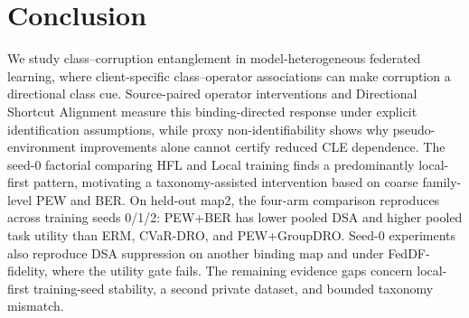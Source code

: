 \section{Conclusion}

We study class--corruption entanglement in model-heterogeneous federated learning, where client-specific class--operator associations can make corruption a directional class cue. Source-paired operator interventions and Directional Shortcut Alignment measure this binding-directed response under explicit identification assumptions, while proxy non-identifiability shows why pseudo-environment improvements alone cannot certify reduced CLE dependence. The seed-0 factorial comparing HFL and Local training finds a predominantly local-first pattern, motivating a taxonomy-assisted intervention based on coarse family-level PEW and BER. On held-out map2, the four-arm comparison reproduces across training seeds 0/1/2: PEW+BER has lower pooled DSA and higher pooled task utility than ERM, CVaR-DRO, and PEW+GroupDRO. Seed-0 experiments also reproduce DSA suppression on another binding map and under FedDF-fidelity, where the utility gate fails. The remaining evidence gaps concern local-first training-seed stability, a second private dataset, and bounded taxonomy mismatch.
